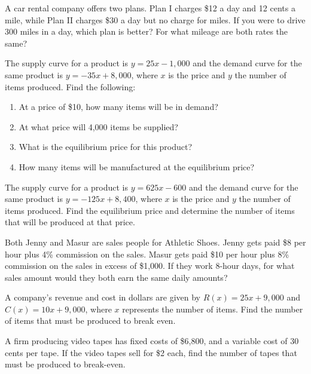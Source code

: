 \begin{puzzle}
    A car rental company offers two plans. Plan I charges \$12 a day and 12 cents a mile, while Plan II charges \$30 a day but no charge for miles. If you were to drive 300 miles in a day, which plan is better? For what mileage are both rates the same?
\end{puzzle}

\begin{puzzle}
    The supply curve for a product is \( y = 25x - 1,000 \) and the demand curve for the same product is \( y = -35x + 8,000 \), where \( x \) is the price and \( y \) the number of items produced. Find the following:
    \begin{enumerate}
        \item At a price of \$10, how many items will be in demand?
        \item At what price will 4,000 items be supplied?
        \item What is the equilibrium price for this product?
        \item How many items will be manufactured at the equilibrium price?
    \end{enumerate}
\end{puzzle}

\begin{puzzle}
    The supply curve for a product is \( y = 625x - 600 \) and the demand curve for the same product is \( y = -125x + 8,400 \), where \( x \) is the price and \( y \) the number of items produced. Find the equilibrium price and determine the number of items that will be produced at that price.
\end{puzzle}

\begin{puzzle}
    Both Jenny and Masur are sales people for Athletic Shoes. Jenny gets paid \$8 per hour plus 4\% commission on the sales. Masur gets paid \$10 per hour plus 8\% commission on the sales in excess of \$1,000. If they work 8-hour days, for what sales amount would they both earn the same daily amounts?
\end{puzzle}

\begin{puzzle}
    A company’s revenue and cost in dollars are given by \( R(x) = 25x + 9,000 \) and \( C(x) = 10x + 9,000 \), where \( x \) represents the number of items. Find the number of items that must be produced to break even.
\end{puzzle}

\begin{puzzle}
    A firm producing video tapes has fixed costs of \$6,800, and a variable cost of 30 cents per tape. If the video tapes sell for \$2 each, find the number of tapes that must be produced to break-even.
\end{puzzle}

